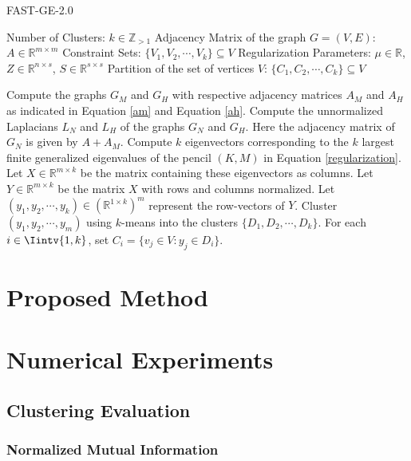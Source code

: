 \begin{algorithm}
\caption{FAST-GE-2.0}\label{fastge2alg}
\begin{algorithmic}[1]
   \Require 
      \Statex Number of Clusters: $k \in \mathbb Z_{>1}$
      \Statex Adjacency Matrix of the graph $G=(V,E)$: $A \in \mathbb R ^ {m \times m}$ 
      \Statex Constraint Sets: $\{ V_1, V_2, \cdots, V_k \} \subseteq V$
      \Statex Regularization Parameters: $\mu \in \mathbb R$, $Z \in \mathbb R ^{n \times s}$, $S \in \mathbb R ^{s \times s}$
   \Ensure 
      \Statex Partition of the set of vertices $V$: $\{ C_1, C_2, \cdots, C_k \} \subseteq V$
      \vspace{0.2 cm}

   \State Compute the graphs $G_M$ and $G_H$ with respective adjacency matrices $A_M$ and $A_H$ as indicated in Equation \vref{am} and Equation \vref{ah}.
   \State Compute the unnormalized Laplacians $L_N$ and $L_H$ of the graphs $G_N$ and $G_H$. Here the adjacency matrix of $G_N$ is given by $A + A_M$.
   \State Compute $k$ eigenvectors corresponding to the $k$ largest finite generalized eigenvalues of the pencil $(K,M)$ in Equation \vref{regularization}. Let $X \in \mathbb R ^{m \times k}$ be the matrix containing these eigenvectors as columns.
   \State Let $Y \in \mathbb R ^{m \times k}$ be the matrix $X$ with rows and columns normalized.
   \State Let $(y_1, y_2, \cdots, y_k) \in (\mathbb R^{1 \times k})^m$ represent the row-vectors of $Y$.
   \State Cluster $(y_1, y_2, \cdots, y_m)$ using $k$-means into the clusters $ \{ D_1, D_2, \cdots, D_k \}$.
   \State For each $i \in \Iintv{1,k}$, set $C_i = \{ v_j \in V: y_j \in D_i \}$.
\end{algorithmic}
\end{algorithm}



\chapter{Proposed Method}


\chapter{Numerical Experiments}
\section{Clustering Evaluation}
\subsection{Normalized Mutual Information}

